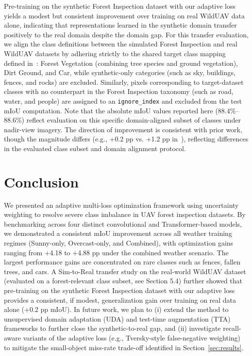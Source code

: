 \documentclass[journal,compsoc]{IEEEtran}
\begin{document}
Pre-training on the synthetic Forest Inspection dataset with our adaptive loss yields a modest but consistent improvement over training on real WildUAV data alone, indicating that representations learned in the synthetic domain transfer positively to the real domain despite the domain gap. For this transfer evaluation, we align the class definitions between the simulated Forest Inspection and real WildUAV datasets by adhering strictly to the shared target class mapping defined in~\cite{forestdataset}: Forest Vegetation (combining tree species and ground vegetation), Dirt Ground, and Car, while synthetic-only categories (such as sky, buildings, fences, and rocks) are excluded. Similarly, pixels corresponding to target-dataset classes with no counterpart in the Forest Inspection taxonomy (such as road, water, and people) are assigned to an \texttt{ignore\_index} and excluded from the test mIoU computation. Note that the absolute mIoU values reported here (88.4\%--88.6\%) reflect evaluation on this specific domain-aligned subset of classes under nadir-view imagery. The direction of improvement is consistent with prior work, though the magnitude differs (e.g., +0.2 pp vs. +1.2 pp in~\cite{forestdataset}), reflecting differences in the evaluated class subset and domain alignment protocol.


\section{Conclusion}
\label{sec:conclusion}
We presented an adaptive multi-loss optimization framework using uncertainty weighting to resolve severe class imbalance in UAV forest inspection datasets. By benchmarking across four distinct convolutional and Transformer-based models, we demonstrated a consistent mIoU improvement across all weather training regimes (Sunny-only, Overcast-only, and Combined), with optimization gains ranging from +4.18 to +4.88 pp under the combined weather scenario. The largest performance gains are concentrated on rare classes such as fences, fallen trees, and cars. A Sim-to-Real transfer study on the real-world WildUAV dataset (evaluated on a forest-relevant class subset, see Section 5.4) further showed that pre-training on the synthetic Forest Inspection dataset with our adaptive loss provides a consistent, if modest, generalization gain over training on real data alone (+0.2 pp mIoU). In future work, we plan to (i) extend the method to unsupervised domain adaptation (UDA) and test-time augmentation (TTA) frameworks to further close the synthetic-to-real gap, and (ii) investigate recall-aware variants of the adaptive loss (e.g., Tversky-style false-negative weighting) to mitigate the small-object miss-rate trade-off identified in Section~\ref{sec:results}.
\end{document}
